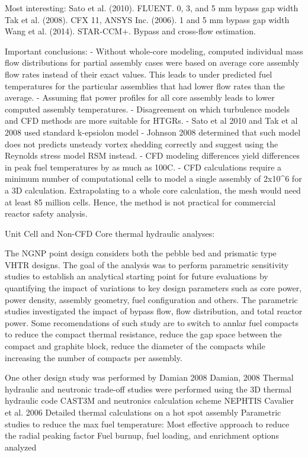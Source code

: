 Most interesting:
Sato et al. (2010). FLUENT.  0, 3, and 5 mm bypass gap width
Tak et al. (2008). CFX 11, ANSYS Inc. (2006). 1 and 5 mm bypass gap width
Wang et al. (2014). STAR-CCM+. Bypass and cross-flow estimation.

Important conclusions:
- Without whole-core modeling, computed individual mass flow distributions for partial assembly cases were based on average core assembly flow rates instead of their exact values.
This leads to under predicted fuel temperatures for the particular assemblies that had lower flow rates than the average.
- Assuming flat power profiles for all core assembly leads to lower computed assembly temperatures.
- Disagreement on which turbulence models and CFD methods are more suitable for HTGRs.
	- Sato et al 2010 and Tak et al 2008 used standard k-epsiolon model
	- Johnson 2008 determined that such model does not predicts unsteady vortex shedding correctly and suggest using the Reynolds stress model RSM instead.
	- CFD modeling differences yield differences in peak fuel temperatures by as much as 100C.
- CFD calculations require a minimum number of computational cells to model a single assembly of 2x10^6 for a 3D calculation.
Extrapolating to a whole core calculation, the mesh would need at least 85 million cells.
Hence, the method is not practical for commercial reactor safety analysis.

Unit Cell and Non-CFD Core thermal hydraulic analyses:

The NGNP point design considers both the pebble bed and prismatic type VHTR designs.
The goal of the analysis was to perform parametric sensitivity studies to establish an analytical starting point for future evaluations by quantifying the impact of variations to key design parameters such as core power, power density, assembly geometry, fuel configuration and
others.
The parametric studies investigated the impact of bypass flow, flow distribution, and total reactor power.
Some recomendations of such study are to switch to annlar fuel compacts to reduce the compact thermal resistance, reduce the gap space between the compact and graphite block, reduce the diameter of the compacts while increasing the number of compacts per assembly.

One other design study was performed by Damian 2008
Damian, 2008 %
Thermal hydraulic and neutronic trade-off studies were performed using the 3D thermal hydraulic code CAST3M and neutronics calculation scheme NEPHTIS
Cavalier et al. 2006
Detailed thermal calculations on a hot spot assembly
Parametric studies to reduce the max fuel temperature:
Most effective approach to reduce the radial peaking factor
Fuel burnup, fuel loading, and enrichment options analyzed

